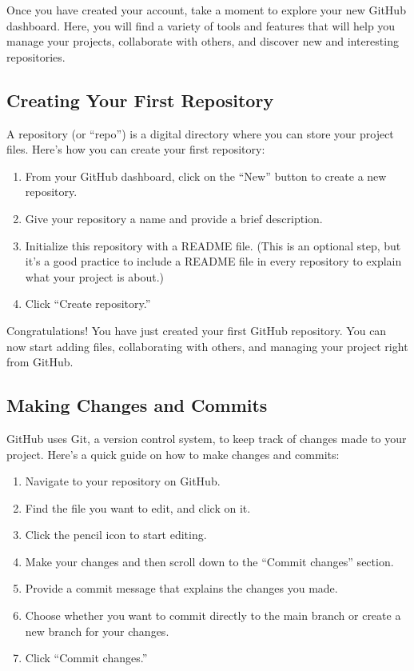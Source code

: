 \documentclass{book}
\begin{document}
Once you have created your account, take a moment to explore your new GitHub dashboard. Here, you will find a variety of tools and features that will help you manage your projects, collaborate with others, and discover new and interesting repositories.

\subsection*{Creating Your First Repository}

A repository (or “repo”) is a digital directory where you can store your project files. Here’s how you can create your first repository:

\begin{enumerate}
    \item From your GitHub dashboard, click on the “New” button to create a new repository.
    \item Give your repository a name and provide a brief description.
    \item Initialize this repository with a README file. (This is an optional step, but it’s a good practice to include a README file in every repository to explain what your project is about.)
    \item Click “Create repository.”
\end{enumerate}

Congratulations! You have just created your first GitHub repository. You can now start adding files, collaborating with others, and managing your project right from GitHub.

\subsection*{Making Changes and Commits}

GitHub uses Git, a version control system, to keep track of changes made to your project. Here’s a quick guide on how to make changes and commits:

\begin{enumerate}
    \item Navigate to your repository on GitHub.
    \item Find the file you want to edit, and click on it.
    \item Click the pencil icon to start editing.
    \item Make your changes and then scroll down to the “Commit changes” section.
    \item Provide a commit message that explains the changes you made.
    \item Choose whether you want to commit directly to the main branch or create a new branch for your changes.
    \item Click “Commit changes.”
\end{enumerate}
\end{document}
